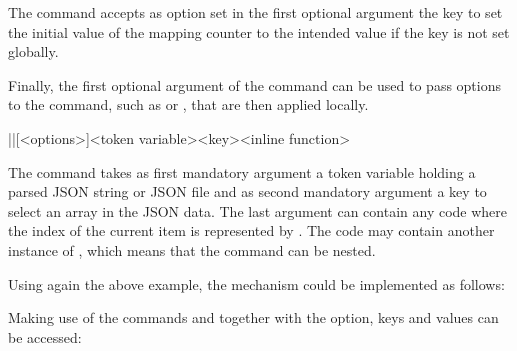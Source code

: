 \documentclass[a4paper]{article}
\begin{document}
{{The command \macro{\JSONParseArrayMapFunction} accepts as option set in the first optional argument the key  to set the initial value of the mapping counter to the intended value if the key  is not set globally.

Finally, the first optional argument of the command can be used to pass options to the command, such as  or , that are then applied locally.

\begin{macrodef}
|\JSONParseArrayMapInline|[<options>]{<token variable>}{<key>}{<inline function>}
\end{macrodef}
The command \macro{\JSONParseArrayMapInline} takes as first mandatory argument a token variable holding a parsed JSON string or JSON file and as second mandatory argument a key to select an array in the JSON data. The last argument can contain any code where the index of the current item is represented by . The code may contain another instance of \macro{\JSONParseArrayMapInline}, which means that the command can be nested.

Using again the above example, the mechanism could be implemented as follows:

\begin{codeexamplecolumns}
\end{codeexamplecolumns}

Making use of the commands \macro{\JSONParseKeys} and \macro{\JSONParseValue} together with the  option, keys and values can be accessed:


}}
\end{document}
